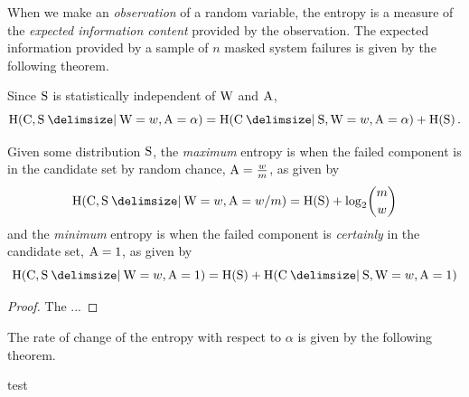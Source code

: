 \documentclass[
    11pt,
    extrafontsizes,
    article,
    oldfontcommands,
    final,
    oneside,
    openany,
    hidelinks]{memoir}
\begin{document}
When we make an \emph{observation} of a random variable, the entropy is a measure of the \emph{expected information content} provided by the observation.
The expected information provided by a sample of $n$ masked system failures is given by the following theorem.
\begin{theorem}
Since $\mathrm{S}$ is statistically independent of $\mathrm{W}$ and $\mathrm{A}$,
\begin{equation}
	\entropy(\rvcand, \sv \Given \RV{W} = w, \RV{A} = \alpha) = \entropy(\rvcand \Given \sv, \RV{W} = w, \RV{A} = \alpha) + \entropy(\sv)\,.
\end{equation}
\end{theorem}

Given some distribution $\mathrm{S}$, the \emph{maximum} entropy is when the failed component is in the candidate set by random chance, $\mathrm{A} = \frac{w}{m}$, as given by
\begin{equation}
\entropy(\rvcand, \sv \Given \RV{W}=w,\RV{A}=w/m) = \entropy(\sv) + \log_2 \! \binom{m}{w}
\end{equation}
and the \emph{minimum} entropy is when the failed component is \emph{certainly} in the candidate set, $\mathrm{A}=1$, as given by
\begin{equation}
	\entropy(\rvcand, \sv \Given \RV{W}=w,\RV{A}=1) = \entropy(\sv) + \entropy(\rvcand \Given \sv, \RV{W} = w, \RV{A} = 1)
\end{equation}
\begin{proof}
The ...
\end{proof}

The rate of change of the entropy with respect to $\alpha$ is given by the following theorem.
\begin{theorem}
	test
\end{theorem}
\end{document}
